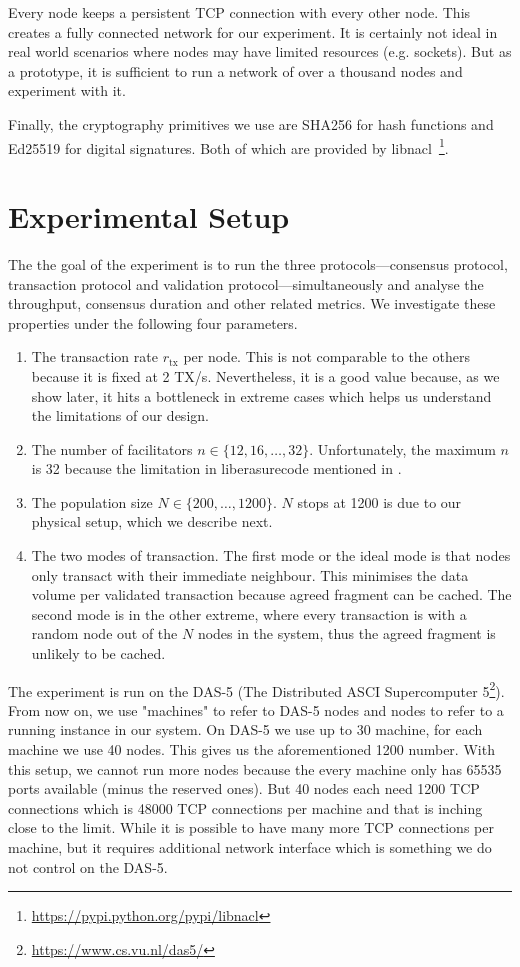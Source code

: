 Every node keeps a persistent TCP connection with every other node.
This creates a fully connected network for our experiment.
It is certainly not ideal in real world scenarios where nodes may have limited resources (e.g. sockets).
But as a prototype, it is sufficient to run a network of over a thousand nodes and experiment with it.

Finally, the cryptography primitives we use are SHA256 for hash functions and Ed25519 for digital signatures.
Both of which are provided by libnacl~\footnote{\url{https://pypi.python.org/pypi/libnacl}}.


\section{Experimental Setup}
\label{sec:experimental-setup}

The the goal of the experiment is to run the three protocols---consensus protocol,
transaction protocol and validation protocol---simultaneously and analyse the throughput, consensus duration and other related metrics.
We investigate these properties under the following four parameters.
\begin{enumerate}
  \item The transaction rate $r_{\text{tx}}$ per node. This is not comparable to the others because it is fixed at 2 TX/s.
        Nevertheless, it is a good value because, as we show later,
        it hits a bottleneck in extreme cases which helps us understand the limitations of our design.
  \item The number of facilitators $n \in \{ 12, 16, \dots, 32\}$.
        Unfortunately, the maximum $n$ is 32 because the limitation in liberasurecode mentioned in .
  \item The population size $N \in \{200, \dots, 1200\}$.
        $N$ stops at 1200 is due to our physical setup, which we describe next.
  \item The two modes of transaction.
        The first mode or the ideal mode is that nodes only transact with their immediate neighbour. 
        This minimises the data volume per validated transaction because agreed fragment can be cached.
        The second mode is in the other extreme, where every transaction is with a random node out of the $N$ nodes in the system,
        thus the agreed fragment is unlikely to be cached.
\end{enumerate}

The experiment is run on the DAS-5 (The Distributed ASCI Supercomputer 5\footnote{\url{https://www.cs.vu.nl/das5/}}).
From now on, we use "machines" to refer to DAS-5 nodes and nodes to refer to a running instance in our system.
On DAS-5 we use up to 30 machine, for each machine we use 40 nodes.
This gives us the aforementioned 1200 number.
With this setup, we cannot run more nodes because the every machine only has 65535 ports available (minus the reserved ones).
But 40 nodes each need 1200 TCP connections which is 48000 TCP connections per machine and that is inching close to the limit.
While it is possible to have many more TCP connections per machine,
but it requires additional network interface which is something we do not control on the DAS-5.

